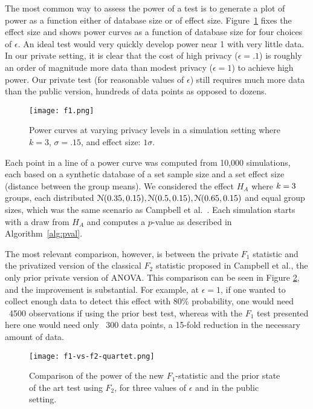 The most common way to assess the power of a test is to generate a plot of power as a function either of database size or of effect size. Figure~\ref{Fig:f1} fixes the effect size and shows power curves as a function of database size for four choices of $\epsilon$. An ideal test would very quickly develop power near 1 with very little data. In our private setting, it is clear that the cost of high privacy ($\epsilon = .1$) is roughly an order of magnitude more data than modest privacy ($\epsilon = 1$) to achieve high power. Our private test (for reasonable values of $\epsilon$) still requires much more data than the public version, hundreds of data points as opposed to dozens.

\begin{figure}
\centering
\texttt{[image: f1.png]}
\caption{Power curves at varying privacy levels in a simulation setting where $k = 3$, $\sigma = .15$, and effect size: $1\sigma$.\label{Fig:f1}}
\end{figure}

Each point in a line of a power curve was computed from 10,000 simulations, each based on a synthetic database of a set sample size and a set effect size (distance between the group means).  We considered the effect $H_A$ where $k=3$ groups, each distributed $\mathcal{N}(0.35, 0.15),  \mathcal{N}(0.5,0.15), \mathcal{N}(0.65, 0.15)$ and equal group sizes, which was the same scenario as Campbell et al.~\cite{campbell2018diffprivanova}.
Each simulation starts with a draw from $H_A$ and computes a $p$-value as described in Algorithm~\ref{alg:pval}.

The most relevant comparison, however, is between the private $F_1$ statistic and the privatized version of the classical $F_2$ statistic proposed in Campbell et al., the only prior private version of ANOVA.  This comparison can be seen in Figure \ref{Fig:f1-vs-f2}, and the improvement is substantial.  For example, at $\epsilon = 1$, if one wanted to collect enough data to detect this effect with 80\% probability, one would need ~4500 observations if using the prior best test, whereas with the $F_1$ test presented here one would need only ~300 data points, a 15-fold reduction in the necessary amount of data.

\begin{figure}
\centering
\texttt{[image: f1-vs-f2-quartet.png]}
\caption{Comparison of the power of the new $F_1$-statistic and the prior state of the art test using $F_2$, for three values of $\epsilon$ and in the public setting.\label{Fig:f1-vs-f2}}
\end{figure}

